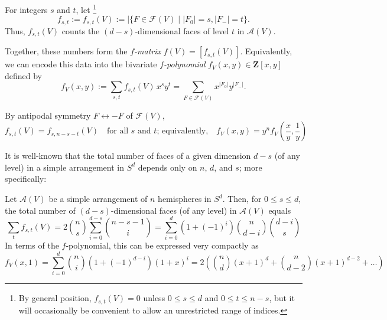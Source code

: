 \documentclass[a4paper,USenglish,cleveref, autoref, thm-restate,nolineno]{socg-lipics-v2021}
\newcommand{\arr}{\mathcal{A}}
\newcommand{\fpoly}{f}
\renewcommand{\leq}{\leqslant}
\newcommand{\Z}{\mathbf{Z}}
\begin{document}
\begin{definition}
\label{def:f-poly}
For integers $s$ and $t$, let%
\footnote{By general position, $f_{s,t}(V)=0$ unless $0\leq s\leq d$ and $0\leq t\leq n-s$, but it will occasionally be convenient to allow an unrestricted range of indices.}
$$
f_{s,t} := f_{s,t}(V):=|\{F\in \mathcal{F}(V)\mid |F_0|=s,|F_-|=t\}.
$$
Thus, $f_{s,t}(V)$ counts the $(d-s)$-dimensional faces of level $t$ in $\arr(V)$. 

Together, these numbers form the \emph{$f$-matrix} $f(V)=[f_{s,t}(V)]$. Equivalently, we can encode this data into the bivariate \emph{$f$-polynomial} $\fpoly_V(x,y) \in  \Z[x,y]$ defined by 
$$
f_{V}(x,y) := \sum_{s,t} f_{s,t}(V)\, x^s y^t =\sum_{F\in \mathcal{F}(V)} x^{|F_0|} y^{|F_-|}.
$$
\end{definition}
\begin{observation} 
\label{obs:f-antipodal-symm} By antipodal symmetry $F\leftrightarrow -F$ of $\mathcal{F}(V)$, 
\begin{equation}
\label{eq:f-symm}
f_{s,t}(V)=f_{s,n-s-t}(V) \quad \textrm{for all $s$ and $t$; equivalently,} \textstyle \quad f_V(x,y)= y^n f_V(\frac{x}{y},\frac{1}{y})
\end{equation}
\end{observation}
It is well-known \cite[Sec.~18.1]{Grunbaum:2003aa} that the total number of faces of a given dimension $d-s$ (of any level) in a simple arrangement in $S^d$ depends only on $n$, $d$, and $s$; more specifically:
\begin{lemma}
Let $\arr(V)$ be a simple arrangement of $n$ hemispheres in $S^d$. Then, for $0\leq s\leq d$,
the total number of $(d-s)$-dimensional faces (of any level) in $\arr(V)$ equals
\begin{equation}
\label{eq:total-number-faces}
\sum_t f_{s,t}(V) = 2\binom{n}{s}\sum_{i=0}^{d-s} \binom{n-s-1}{i} = \sum_{i=0}^d (1+(-1)^i)\binom{n}{d-i} \binom{d-i}{s}
\end{equation}
In terms of the $f$-polynomial, this can be expressed very compactly as
\begin{equation}
\label{eq:f-tutte}
\textstyle f_V(x,1) = \sum_{i=0}^d \binom{n}{i}\left(1+(-1)^{d-i}\right)(1+x)^i = 2\left(\binom{n}{d}(x+1)^d + \binom{n}{d-2}(x+1)^{d-2} + \dots\right)
\end{equation}
\end{lemma}
\end{document}
